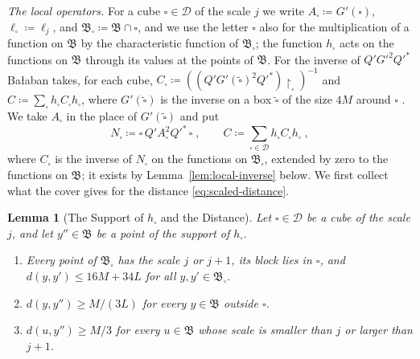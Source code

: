 \documentclass[11pt]{preprint}
\numberwithin{equation}{section}
\newtheorem{lemma}[theorem]{Lemma}
\theoremstyle{definition}
\theoremstyle{remark}
\theoremstyle{plain}
\begin{document}
\emph{The local operators.} For a cube $\square \in \mathscr D$ of the scale $j$ we write $A_\square \coloneqq G'(\square)$, $\ell_\square \coloneqq \ell_j$, and $\mathfrak B_\square \coloneqq \mathfrak B \cap \square$, and we use the letter $\square$ also for the multiplication of a function on $\mathfrak B$ by the characteristic function of $\mathfrak B_\square$; the function $h_\square$ acts on the functions on $\mathfrak B$ through its values at the points of $\mathfrak B$. For the inverse of $Q'G'^2Q'^*$ Ba{\l}aban takes, for each cube, $C_\square \coloneqq ((Q'G'(\tilde\square)^2Q'^*)\restriction_\square)^{-1}$ and $C \coloneqq \sum_\square h_\square C_\square h_\square$, where $G'(\tilde\square)$ is the inverse on a box $\tilde\square$ of the size $4M$ around $\square$ \cite[(2.70), p.~235]{BalabanPRT2}. We take $A_\square$ in the place of $G'(\tilde\square)$ and put
\begin{equation}\label{eq:local-compression}
    N_\square \coloneqq \square\,Q'A_\square^2Q'^*\,\square\;,
    \qquad
    C \coloneqq \sum_{\square \in \mathscr D}h_\square C_\square h_\square\;,
\end{equation}
where $C_\square$ is the inverse of $N_\square$ on the functions on $\mathfrak B_\square$, extended by zero to the functions on $\mathfrak B$; it exists by Lemma~\ref{lem:local-inverse} below. We first collect what the cover gives for the distance \eqref{eq:scaled-distance}.

\begin{lemma}[The Support of $h_\square$ and the Distance]\label{lem:support-distance}
Let $\square \in \mathscr D$ be a cube of the scale $j$, and let $y'' \in \mathfrak B$ be a point of the support of $h_\square$.
\begin{enumerate}[label=(\roman*)]
\item Every point of $\mathfrak B_\square$ has the scale $j$ or $j + 1$, its block lies in $\square$, and $d(y, y') \leq 16M + 34L$ for all $y, y' \in \mathfrak B_\square$.
\item $d(y, y'') \geq M/(3L)$ for every $y \in \mathfrak B$ outside $\square$.
\item $d(u, y'') \geq M/3$ for every $u \in \mathfrak B$ whose scale is smaller than $j$ or larger than $j + 1$.
\end{enumerate}
\end{lemma}
\end{document}

